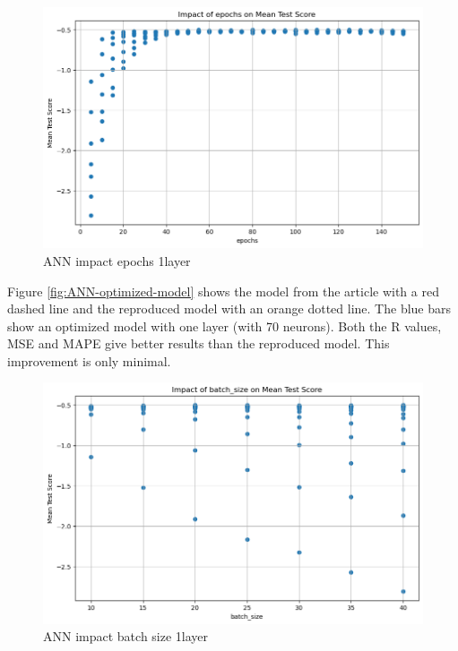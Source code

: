 \documentclass{article}
\begin{document}
\begin{figure}
	\centering
	\includegraphics[width=\linewidth]{figures/ANN_impact_epochs_1layer.png}
	\caption{ANN impact epochs 1layer}
	\label{fig:ANN-impact-epochs-1layer}
\end{figure}

Figure \ref{fig:ANN-optimized-model} shows the model from the article with a red dashed line and the reproduced model with an orange dotted line. The blue bars show an optimized model with one layer (with 70 neurons). Both the R values, MSE and MAPE give better results than the reproduced model. This improvement is only minimal.

\begin{figure}
	\centering
	\includegraphics[width=\linewidth]{figures/ANN_impact_batchsize_1layer.png}
	\caption{ANN impact batch size 1layer}
	\label{fig:ANN-impact-batchsize-1layer}
\end{figure}
\end{document}
